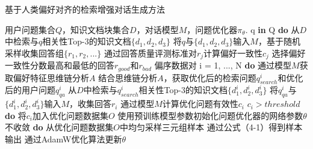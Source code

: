 \renewcommand{\algorithmcfname}{算法}
\begin{algorithm}
	\caption{基于人类偏好对齐的检索增强对话生成方法} %
	
	\begin{algorithmic}[1]
		用户问题集合$Q$，知识文档块集合$D$，对话模型$M$，问题优化器$\pi_\theta$.
		 q {\bf in} Q {\bf do}
		\STATE \qquad 从$D$中检索与$q$相关性Top-3的知识文档$\{d_1, d_2, d_3\}$
		\STATE \qquad 将$q$与$\{d_1, d_2, d_3\}$输入$M$，基于随机采样收集回答组$\{r_1, r_2, ...\}$
		\STATE \qquad 通过回答质量评测标准对$r_j$计算偏好一致性$c_j$
		\STATE \qquad 选择偏好一致性分数最高和最低的回答$r_{good}$和$r_{bad}$
		 偏序数据对 i = 1, ..., N {\bf do}
		\STATE \qquad 通过模型$M$获取偏好特征思维链分析$A$
		\STATE \qquad 结合思维链分析$A$，获取优化后的检索问题$q^i_{search}$和优化后的用户问题$q^i_{qa}$
		\STATE \qquad 从$D$中检索与$q^i_{search}$相关性Top-3的知识文档$\{d^i_1, d^i_2, d^i_3\}$
		\STATE \qquad 将$q^i_{qa}$与$\{d^i_1, d^i_2, d^i_3\}$输入$M$，收集回答$r_i$
		\STATE \qquad 通过模型$M$计算优化问题有效性$c_i$
		\STATE {} $c_i > threshold$ {\bf do}
		\STATE \qquad \qquad 将$c_i$加入优化问题数据集$O$
		\STATE 使用预训练模型参数初始化问题优化器的网络参数$\theta$
		 不收敛 {\bf do}
		\STATE \qquad 从优化问题数据集$O$中均匀采样三元组样本
		\STATE \qquad 通过公式（4-1）得到样本输出
		\STATE \qquad 通过AdamW优化算法更新$\theta$
	\end{algorithmic}
\end{algorithm}

